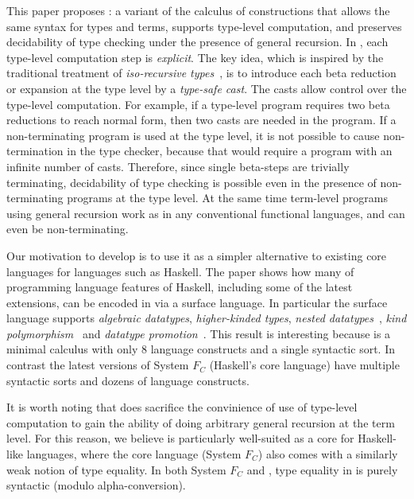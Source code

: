 This paper proposes \name: a variant of the calculus of constructions
that allows the same syntax for types and terms, supports type-level
computation, and preserves decidability of type checking under the
presence of general recursion. In \name, each type-level computation
step is \emph{explicit}.  The key idea, which is inspired by the traditional
treatment of \emph{iso-recursive types}~\cite{tapl}, is to introduce each beta
reduction or expansion at the type level by a \emph{type-safe
  cast}. The
casts allow control over the type-level computation. For example, if
a type-level program requires two beta reductions to reach normal
form, then two casts are needed in the program. If a non-terminating
program is used at the type level, it is not possible to cause
non-termination in the type checker, because that would require a
program with an infinite number of casts. Therefore, since single beta-steps are
trivially terminating, decidability of type checking is possible even
in the presence of non-terminating programs at the type level.
At the same time term-level programs using general recursion 
work as in any conventional functional languages, and can even 
be non-terminating. 

Our motivation to develop \name is to use it as a simpler alternative
to existing core languages for languages such as Haskell. 
The paper shows how many of programming language features of
Haskell, including some of the latest extensions, can be encoded in
\name via a surface language. In particular the surface language
supports \emph{algebraic datatypes}, \emph{higher-kinded types},
\emph{nested datatypes}~\cite{nesteddt}, \emph{kind polymorphism}~\cite{fc:pro} and
\emph{datatype promotion}~\cite{fc:pro}.  This result is interesting because
\name is a minimal calculus with only 8 language constructs and a
single syntactic sort. In contrast the latest versions of System
$F_{C}$ (Haskell's core language) have multiple syntactic sorts and
dozens of language constructs.  

It is worth noting that \name does sacrifice the convinience of use of type-level computation
to gain the ability of doing arbitrary general recursion at the term
level.  For this reason, we believe \name is particularly well-suited
as a core for Haskell-like languages, where the core language (System
$F_{C}$) also comes with a similarly weak notion of type equality.  In
both System $F_{C}$ and \name, type equality in \name is purely
syntactic (modulo alpha-conversion).

